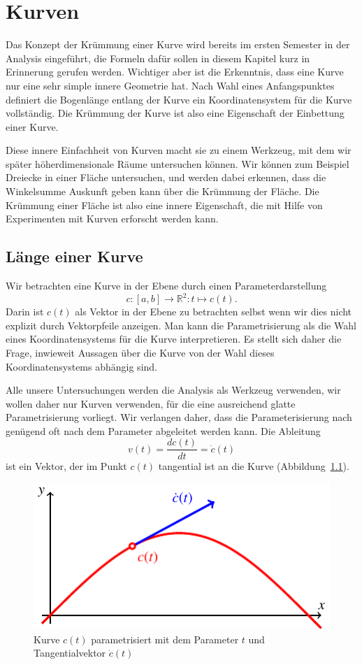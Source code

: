 %
%
%
\chapter{Kurven%
\label{skript:chapter:kurven}}
\rhead{}
Das Konzept der Krümmung einer Kurve wird bereits im ersten Semester
in der Analysis eingeführt,
die Formeln dafür sollen in diesem Kapitel kurz in Erinnerung gerufen werden.
Wichtiger aber ist die Erkenntnis, dass eine Kurve nur eine sehr simple
innere Geometrie hat.
Nach Wahl eines Anfangspunktes definiert die Bogenlänge entlang der Kurve 
ein Koordinatensystem für die Kurve vollständig.
Die Krümmung der Kurve ist also eine Eigenschaft der Einbettung einer Kurve.

Diese innere Einfachheit von Kurven macht sie zu einem Werkzeug, mit
dem wir später höher\-dimensionale Räume untersuchen können.
Wir können zum Beispiel Dreiecke in einer Fläche untersuchen,
und werden dabei erkennen, dass die Winkelsumme Auskunft geben kann
über die Krümmung der Fläche.
Die Krümmung einer Fläche ist also eine innere Eigenschaft, die mit
Hilfe von Experimenten mit Kurven erforscht werden kann.

\section{Länge einer Kurve}
Wir betrachten eine Kurve in der Ebene durch einen Parameterdarstellung
\[
c\colon [a,b] \to\mathbb R^2:t\mapsto c(t).
\]
Darin ist $c(t)$ als Vektor in der Ebene zu betrachten selbst wenn
wir dies nicht explizit durch Vektorpfeile anzeigen.
Man kann die Parametrisierung als die Wahl eines Koordinatensystems
für die Kurve interpretieren.
Es stellt sich daher die Frage, inwieweit Aussagen über die Kurve von
der Wahl dieses Koordinatensystems abhängig sind.

Alle unsere Untersuchungen werden die Analysis als Werkzeug verwenden,
wir wollen daher nur Kurven verwenden, für die eine ausreichend glatte
Parametrisierung vorliegt.
Wir verlangen daher, dass die Parameterisierung nach genügend oft nach
dem Parameter abgeleitet werden kann.
Die Ableitung 
\[
v(t)
=
\frac{dc(t)}{dt}
=
\dot c(t)
\]
ist ein Vektor, der im Punkt $c(t)$ tangential ist an die Kurve 
(Abbildung~\ref{skript:kurve:tangente}).
\begin{figure}
\centering
\includegraphics{chapters/tikz/tangente.pdf}
\caption{Kurve $c(t)$ parametrisiert mit dem Parameter $t$ und Tangentialvektor
$\dot c(t)$
\label{skript:kurve:tangente}}
\end{figure}

